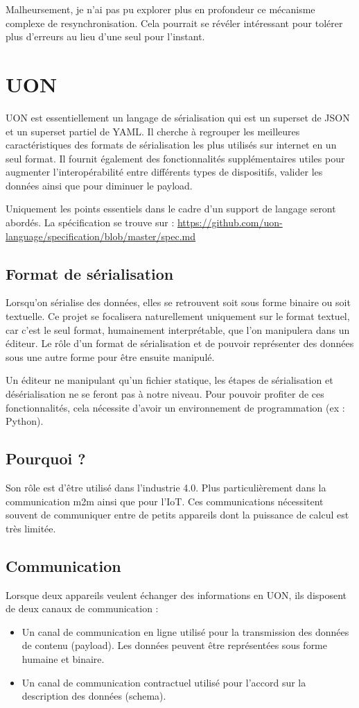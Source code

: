 \documentclass[
    iict, %
    il, %
]{heig-tb}
\begin{document}
Malheursement, je n'ai pas pu explorer plus en profondeur ce mécanisme complexe de resynchronisation.
Cela pourrait se révéler intéressant pour tolérer plus d'erreurs au lieu d'une seul pour l'instant.

\section{UON}\label{UON}
UON est essentiellement un langage de sérialisation qui est un superset de JSON et un superset partiel de YAML.
Il cherche à regrouper les meilleures caractéristiques des formats de sérialisation les plus utilisés sur internet en un seul format.
Il fournit également des fonctionnalités supplémentaires utiles pour augmenter l'interopérabilité entre différents types de dispositifs, valider les données ainsi que pour diminuer le payload.

Uniquement les points essentiels dans le cadre d'un support de langage seront abordés. La spécification se trouve sur :
\url{https://github.com/uon-language/specification/blob/master/spec.md}

\subsection{Format de sérialisation}

Lorsqu'on sérialise des données, elles se retrouvent soit sous forme binaire ou soit textuelle.
Ce projet se focalisera naturellement uniquement sur le format textuel, car c'est le seul format, humainement interprétable, que l'on manipulera dans un éditeur.
Le rôle d'un format de sérialisation et de pouvoir représenter des données sous une autre forme pour être ensuite manipulé.

Un éditeur ne manipulant qu'un fichier statique, les étapes de sérialisation et désérialisation ne se feront pas à notre niveau.
Pour pouvoir profiter de ces fonctionnalités, cela nécessite d'avoir un environnement de programmation (ex : Python).

\subsection{Pourquoi ?}
Son rôle est d'être utilisé dans l'industrie 4.0. Plus particulièrement dans la communication \Gls{m2m} ainsi que pour l'\Gls{IoT}.
Ces communications nécessitent souvent de communiquer entre de petits appareils dont la puissance de calcul est très limitée.

\subsection{Communication}
Lorsque deux appareils veulent échanger des informations en UON, ils disposent de deux canaux de communication :
\begin{itemize}
    \item Un canal de communication en ligne utilisé pour la transmission des données de contenu (payload). Les données peuvent être représentées sous forme humaine et binaire.
    \item Un canal de communication contractuel utilisé pour l'accord sur la description des données (schema).
\end{itemize}
\end{document}
